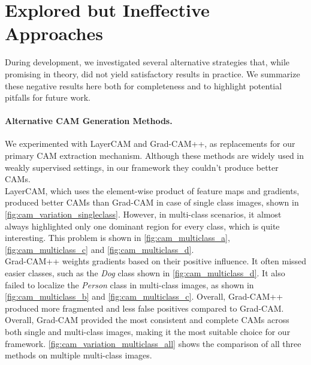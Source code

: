 
\section{Explored but Ineffective Approaches}
\label{sec:ineffective_approaches}

During development, we investigated several alternative strategies that, while promising in theory, did not yield satisfactory results in practice. We summarize these negative results here both for completeness and to highlight potential pitfalls for future work.  

\paragraph{Alternative CAM Generation Methods.} 
We experimented with LayerCAM and Grad-CAM++, as replacements for our primary CAM extraction mechanism. Although these methods are widely used in weakly supervised settings, in our framework they couldn't produce better CAMs. \\
LayerCAM, which uses the element-wise product of feature maps and gradients, produced better CAMs than Grad-CAM in case of single class images, shown in \autoref{fig:cam_variation_singleclass}. However, in multi-class scenarios, it almost always highlighted only one dominant region for every class, which is quite interesting. This problem is shown in \autoref{fig:cam_multiclass_a}, \autoref{fig:cam_multiclass_c} and \autoref{fig:cam_multiclass_d}. \\
Grad-CAM++ weights gradients based on their positive influence. It often missed easier classes, such as the \textit{Dog} class shown in \autoref{fig:cam_multiclass_d}. It also failed to localize the \textit{Person} class in multi-class images, as shown in \autoref{fig:cam_multiclass_b} and \autoref{fig:cam_multiclass_c}. Overall, Grad-CAM++ produced more fragmented and less false positives compared to Grad-CAM.\\
Overall, Grad-CAM provided the most consistent and complete CAMs across both single and multi-class images, making it the most suitable choice for our framework. \autoref{fig:cam_variation_multiclass_all} shows the comparison of all three methods on multiple multi-class images.

